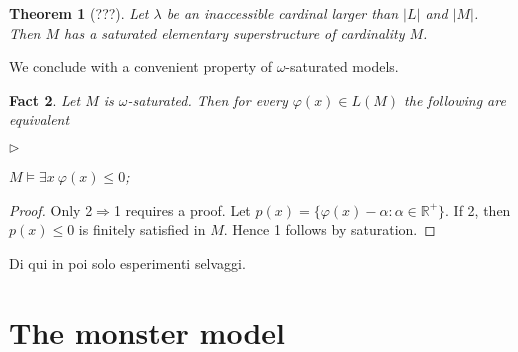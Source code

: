 \documentclass[12pt,letterpaper,oneside,reqno]{amsart}
\newcommand{\mylabel}[1]{{#1}\hfill}
\renewenvironment{itemize}
  {\begin{list}{$\triangleright$}{%
   \setlength{\parskip}{0mm}
   \setlength{\topsep}{.2\baselineskip}
   \setlength{\rightmargin}{0mm}
   \setlength{\listparindent}{0mm}
   \setlength{\itemindent}{0mm}
   \setlength{\labelwidth}{3ex}
   \setlength{\itemsep}{.2\baselineskip}
   \setlength{\parsep}{.2\baselineskip}
   \setlength{\partopsep}{0mm}
   \setlength{\labelsep}{1ex}
   \setlength{\leftmargin}{\labelwidth+\labelsep}
   \let\makelabel\mylabel}}{%
   \end{list}}
\theoremstyle{plain}
\newtheorem{theorem}{Theorem}%
\newtheorem{fact}[theorem]{Fact}
\theoremstyle{remark}
\renewcommand*{\emph}[1]{%
   \smash{\tikz[baseline]\node[rectangle, fill=olive!25, rounded corners, inner xsep=0.5ex, inner ysep=0.2ex, anchor=base, minimum height = 2.7ex]{#1};}}
\begin{document}
\begin{theorem}[???]
  Let $\lambda$ be an inaccessible cardinal larger than $|L|$ and $|M|$.
  Then $M$ has a saturated elementary superstructure of cardinality $M$.
\end{theorem}

We conclude with a convenient property of $\omega$-saturated models.

\begin{fact}\label{fact_existential}
  Let $M$ is $\omega$-saturated.
  Then for every $\varphi(x)\in L(M)$ the following are equivalent
  \begin{itemize}
    \item[1.] $M\models\exists x\ \varphi(x)\le0$;
    \item[2.] 
  \end{itemize}
\end{fact}
\begin{proof}
  Only 2$\Rightarrow$1 requires a proof.
  Let $p(x)=\{\varphi(x)-\alpha: \alpha\in{\mathds R}^+\}$.
  If 2, then $p(x)\le0$ is finitely satisfied in $M$.
  Hence 1 follows by saturation.
\end{proof}








\hrulefill

Di qui in poi solo esperimenti selvaggi.


\section{The monster model}
\end{document}
